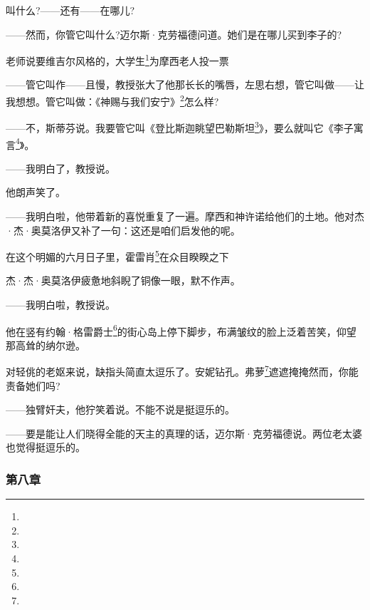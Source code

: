 \par 叫什么?——还有——在哪儿?
\par ——然而，你管它叫什么?迈尔斯·克劳福德问道。她们是在哪儿买到李子的?
\par 老师说要维吉尔风格的，大学生\footnote{}为摩西老人投一票
\par ——管它叫作——且慢，教授张大了他那长长的嘴唇，左思右想，管它叫做——让我想想。管它叫做：《神赐与我们安宁》\footnote{}怎么样?
\par ——不，斯蒂芬说。我要管它叫《登比斯迦眺望巴勒斯坦\footnote{}》，要么就叫它《李子寓言\footnote{}》。
\par ——我明白了，教授说。
\par 他朗声笑了。
\par ——我明白啦，他带着新的喜悦重复了一遍。摩西和神许诺给他们的土地。他对杰·杰·奥莫洛伊又补了一句：这还是咱们启发他的呢。
\par 在这个明媚的六月日子里，霍雷肖\footnote{}在众目睽睽之下
\par 杰·杰·奥莫洛伊疲惫地斜睨了铜像一眼，默不作声。
\par ——我明白啦，教授说。
\par 他在竖有约翰·格雷爵士\footnote{}的街心岛上停下脚步，布满皱纹的脸上泛着苦笑，仰望那高耸的纳尔逊。
\par 对轻佻的老妪来说，缺指头简直太逗乐了。安妮钻孔。弗萝\footnote{}遮遮掩掩然而，你能责备她们吗?
\par ——独臂奸夫，他狞笑着说。不能不说是挺逗乐的。
\par ——要是能让人们晓得全能的天主的真理的话，迈尔斯·克劳福德说。两位老太婆也觉得挺逗乐的。








\subsubsection*{第八章}


